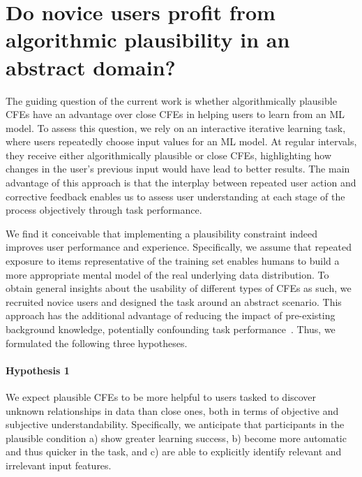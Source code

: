 \section{Do novice users profit from algorithmic plausibility in an abstract domain?}\label{sec:hypotheses}


The guiding question of the current work is whether algorithmically plausible \glspl{CFE} have an advantage over close \glspl{CFE} in helping users to learn from an \gls{ML} model.
To assess this question, we rely on an interactive iterative learning task, where users repeatedly choose input values for an \gls{ML} model.
At regular intervals, they receive either algorithmically plausible or close \glspl{CFE}, highlighting how changes in the user's previous input would have lead to better results.
The main advantage of this approach is that the interplay between repeated user action and corrective feedback enables us to assess user understanding at each stage of the process objectively through task performance.

We find it conceivable that implementing a plausibility constraint indeed improves user performance and experience. 
Specifically, we assume that repeated exposure to items representative of the training set enables humans to build a more appropriate mental model of the real underlying data distribution.
To obtain general insights about the usability of different types of \glspl{CFE} as such, we recruited novice users and designed the task around an abstract scenario.
This approach has the additional advantage of reducing the impact of pre-existing background knowledge, potentially confounding task performance~\citep{van_der_waa_evaluating_2021}. Thus, we formulated the following three hypotheses.

\paragraph{Hypothesis 1} We expect plausible \glspl{CFE} to be more helpful to users tasked to discover unknown relationships in data than close ones, both in terms of objective and subjective understandability. 
Specifically, we anticipate that participants in the plausible condition a) show greater learning success, b) become more automatic and thus quicker in the task, and c) are able to explicitly identify relevant and irrelevant input features.

